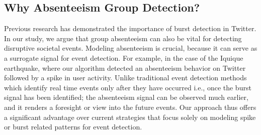 \subsection{Why Absenteeism Group Detection?}
Previous research has demonstrated the importance of burst detection in Twitter. In our study, we argue that group absenteeism can also be vital for detecting disruptive societal events. Modeling absenteeism is crucial, because it can serve as a surrogate signal for event detection. For example, in the case of the Iquique earthquake, where our algorithm  detected an absenteeism behavior on Twitter followed by a spike in user activity. Unlike traditional event detection methods which identify real time events only after they have occurred i.e., once the burst signal has been identified; the absenteeism signal can be observed much earlier, and it renders a foresight or view into the future events. Our approach thus offers a significant advantage over current strategies that focus solely on modeling spike or burst related patterns for event detection.





